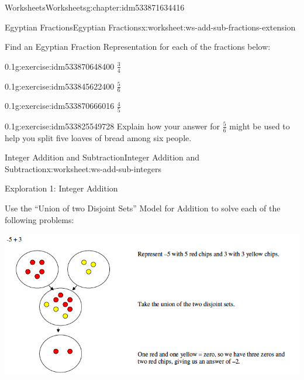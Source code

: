 \documentclass[twoside,11pt,]{book}
\begin{document}
\begin{chapterptx}{Worksheets}{}{Worksheets}{}{}{g:chapter:idm533871634416}
\begin{worksheet-section-numberless}{Egyptian Fractions}{}{Egyptian Fractions}{}{}{x:worksheet:ws-add-sub-fractions-extension}
\begin{introduction}{}
\par
Find an Egyptian Fraction Representation for each of the fractions below:%
\end{introduction}%
\begin{divisionexercise}{1}{}{0.1}{g:exercise:idm533870648400}%
\(\frac{3}{4} \)%
\end{divisionexercise}%
\begin{divisionexercise}{2}{}{0.1}{g:exercise:idm533845622400}%
\(\frac{5}{6} \)%
\end{divisionexercise}%
\begin{divisionexercise}{3}{}{0.1}{g:exercise:idm533870666016}%
\(\frac{4}{5} \)%
\end{divisionexercise}%
\begin{divisionexercise}{4}{}{0.1}{g:exercise:idm533825549728}%
Explain how your answer for \(\frac{5}{6} \) might be used to help you split five loaves of bread among six people.%
\end{divisionexercise}%
\end{worksheet-section-numberless}
\restoregeometry
%
%
\typeout{************************************************}
\typeout{************************************************}
%
\begin{worksheet-section-numberless}{Integer Addition and Subtraction}{}{Integer Addition and Subtraction}{}{}{x:worksheet:ws-add-sub-integers}
\begin{introduction}{}%
Exploration 1: Integer Addition%
\par
Use the ``Union of two Disjoint Sets'' Model for Addition to solve each of the following problems: \begin{sidebyside}{1}{0}{0}{0}%
\begin{sbspanel}{1}%
\includegraphics[width=1\linewidth]{images/integer-add-model.png}

\end{sbspanel}
\end{sidebyside}
\end{introduction}
\end{worksheet-section-numberless}
\end{chapterptx}
\end{document}
